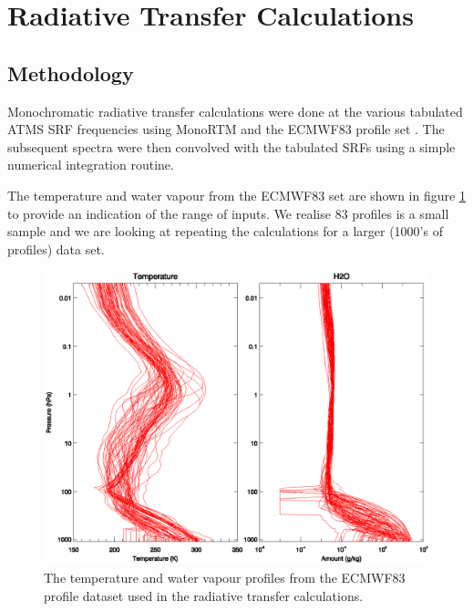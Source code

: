 \section{Radiative Transfer Calculations}

\subsection{Methodology}
Monochromatic radiative transfer calculations were done at the various tabulated ATMS SRF frequencies using MonoRTM \cite{Payne_2008,Clough_2005} and the ECMWF83 profile set \cite{Matricardi_ECMWF564,ECMWF_profile_set2}. The subsequent spectra were then convolved with the tabulated SRFs using a simple numerical integration routine.

The temperature and water vapour from the ECMWF83 set are shown in figure \ref{fig:ECMWF83.AtmProfile} to provide an indication of the range of inputs. We realise 83 profiles is a small sample and we are looking at repeating the calculations for a larger (1000's of profiles) data set. 

\begin{figure}[htp]
  \centering
  \includegraphics[scale=1]{graphics/atmprofile/ECMWF83.AtmProfile.eps}
  \caption{The temperature and water vapour profiles from the ECMWF83 profile dataset used in the radiative transfer calculations.}
  \label{fig:ECMWF83.AtmProfile}
\end{figure}


